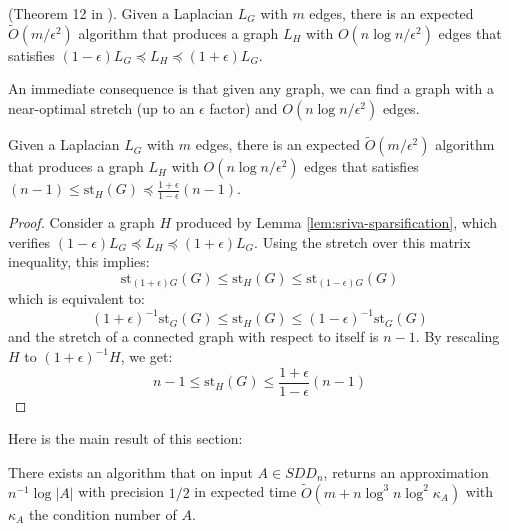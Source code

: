 \begin{lemma}\label{lem:sriva-sparsification}(Theorem 12 in \cite{Spielman2009}).
Given a Laplacian $L_{G}$ with $m$ edges, there is an expected $\tilde{O}\left(m/\epsilon^{2}\right)$
algorithm that produces a graph $L_{H}$ with $O\left(n\log n/\epsilon^{2}\right)$
edges that satisfies $\left(1-\epsilon\right)L_{G}\preceq L_{H}\preceq\left(1+\epsilon\right)L_{G}$.

\end{lemma}

An immediate consequence is that given any graph, we can find a graph
with a near-optimal stretch (up to an $\epsilon$ factor) and $O\left(n\log n/\epsilon^{2}\right)$
edges.

\begin{lemma}\label{lem:low-stretch-bounding}Given a Laplacian $L_{G}$
with $m$ edges, there is an expected $\tilde{O}\left(m/\epsilon^{2}\right)$
algorithm that produces a graph $L_{H}$ with $O\left(n\log n/\epsilon^{2}\right)$
edges that satisfies $\left(n-1\right)\leq\text{st}_{H}\left(G\right)\preceq\frac{1+\epsilon}{1-\epsilon}\left(n-1\right)$.

\end{lemma}

\begin{proof}Consider a graph $H$ produced by Lemma \ref{lem:sriva-sparsification},
which verifies $\left(1-\epsilon\right)L_{G}\preceq L_{H}\preceq\left(1+\epsilon\right)L_{G}$.
Using the stretch over this matrix inequality, this implies:
\[
\text{st}_{\left(1+\epsilon\right)G}\left(G\right)\leq\text{st}_{H}\left(G\right)\leq\text{st}_{\left(1-\epsilon\right)G}\left(G\right)
\]
which is equivalent to:
\[
\left(1+\epsilon\right)^{-1}\text{st}_{G}\left(G\right)\leq\text{st}_{H}\left(G\right)\leq\left(1-\epsilon\right)^{-1}\text{st}_{G}\left(G\right)
\]
and the stretch of a connected graph with respect to itself is $n-1$.
By rescaling $H$ to $\left(1+\epsilon\right)^{-1}H$, we get:
\[
 n-1 \leq\text{st}_{H}\left(G\right)\leq \frac{1+\epsilon}{1-\epsilon}\left(n-1\right)
\]


\end{proof}

Here is the main result of this section:

\begin{proposition}There exists an algorithm that on input $A\in SDD_{n}$,
returns an approximation $n^{-1}\log\left|A\right|$ with precision
$1/2$ in expected time $\tilde{O}\left(m+n\log^{3}n\log^{2}\kappa_{A}\right)$
with $\kappa_{A}$ the condition number of $A$.

\end{proposition}

